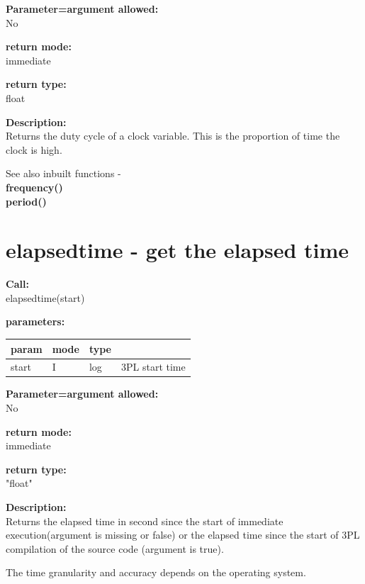         {\bf Parameter=argument allowed:} \\
        No
        
        {\bf return mode:} \\
        immediate

        {\bf return type:} \\
        float
        
        {\bf Description:} \\
        Returns the duty cycle of a clock variable. This is the proportion
        of time the clock is high.
        
        See also inbuilt functions - \\
        {\bf frequency()}  \\
        {\bf period()} 
 

    \section{elapsedtime - get the elapsed time}\label{sec:ifelapsedtime}
        
        {\bf Call:} \\
        elapsedtime(start)
        
        {\bf parameters:} \\
        \begin{tabular}{| l | l | l | l |}
        \hline
        param  & mode & type & \\
        \hline \hline
        start & I & log & 3PL start time   \\ \hline
        \end{tabular}
        
        {\bf Parameter=argument allowed:} \\
        No
        
        {\bf return mode:} \\
        immediate

        {\bf return type:} \\
        "float"
        
        {\bf Description:} \\
        Returns the elapsed time in second since the start of immediate
        execution(argument is missing or false) or the elapsed time since the start
        of 3PL compilation of the source code (argument is true).
        
        The time granularity and accuracy depends on the operating system.

